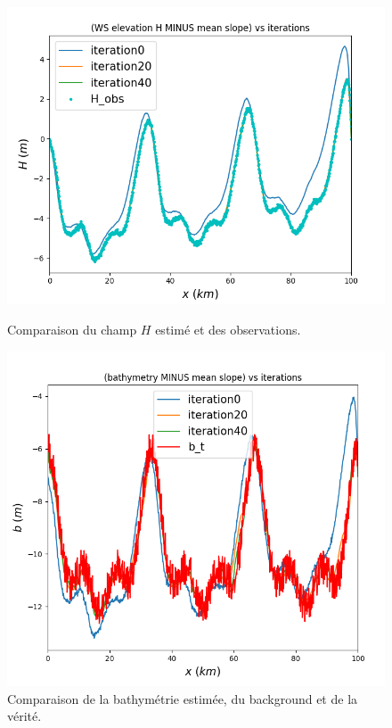 \documentclass{article}
\begin{document}
\begin{figure}[H]
    \vspace{0.5cm}
    
    \begin{minipage}[b]{0.48\linewidth}
        \centering
        \includegraphics[width=\linewidth]{Images_Ayoub/h_connue/H_Comparaison.png}
        \caption{Comparaison du champ \(H\) estimé et des observations.}
        \label{fig:hconnue-Hcomparaison}
    \end{minipage}
    \hfill
    \begin{minipage}[b]{0.48\linewidth}
        \centering
        \includegraphics[width=\linewidth]{Images_Ayoub/h_connue/b_Comparaison.png}
        \caption{Comparaison de la bathymétrie estimée, du background et de la vérité.}
        \label{fig:hconnue-bcomparaison}
    \end{minipage}
    

\end{figure}
\end{document}
